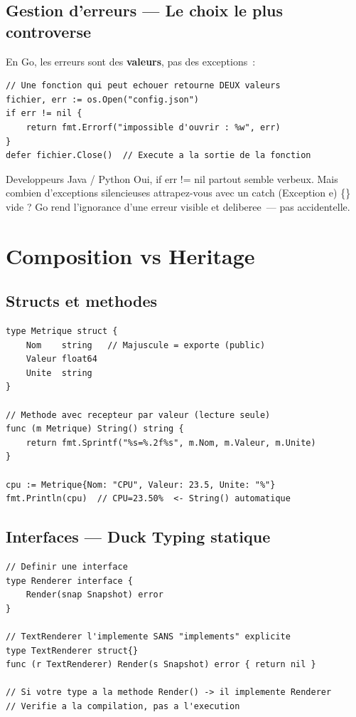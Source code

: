 \documentclass[11pt,a4paper,openany]{book}
\newcommand{\code}[1]{%
  \colorbox{GoLightGrey}{\small\ttfamily\color{GoDark}#1}}
\begin{document}
\section{Gestion d'erreurs --- Le choix le plus controverse}

En Go, les erreurs sont des \textbf{valeurs}, pas des exceptions~:

\begin{lstlisting}[style=goStyle]
// Une fonction qui peut echouer retourne DEUX valeurs
fichier, err := os.Open("config.json")
if err != nil {
    return fmt.Errorf("impossible d'ouvrir : %w", err)
}
defer fichier.Close()  // Execute a la sortie de la fonction
\end{lstlisting}

\begin{boiteZoom}{Developpeurs Java / Python}
Oui, \code{if err != nil} partout semble verbeux. Mais combien d'exceptions
silencieuses attrapez-vous avec un \code{catch (Exception e) \{\}} vide ?
Go rend l'ignorance d'une erreur visible et deliberee~--- pas accidentelle.
\end{boiteZoom}

\chapter{Composition vs Heritage}

\section{Structs et methodes}

\begin{lstlisting}[style=goStyle]
type Metrique struct {
    Nom    string   // Majuscule = exporte (public)
    Valeur float64
    Unite  string
}

// Methode avec recepteur par valeur (lecture seule)
func (m Metrique) String() string {
    return fmt.Sprintf("%s=%.2f%s", m.Nom, m.Valeur, m.Unite)
}

cpu := Metrique{Nom: "CPU", Valeur: 23.5, Unite: "%"}
fmt.Println(cpu)  // CPU=23.50%  <- String() automatique
\end{lstlisting}

\section{Interfaces --- Duck Typing statique}

\begin{lstlisting}[style=goStyle]
// Definir une interface
type Renderer interface {
    Render(snap Snapshot) error
}

// TextRenderer l'implemente SANS "implements" explicite
type TextRenderer struct{}
func (r TextRenderer) Render(s Snapshot) error { return nil }

// Si votre type a la methode Render() -> il implemente Renderer
// Verifie a la compilation, pas a l'execution
\end{lstlisting}
\end{document}
